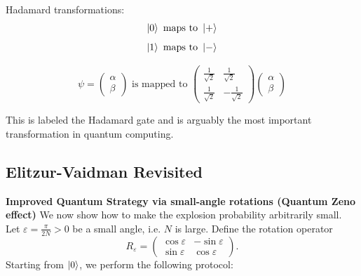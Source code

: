 \begin{center}
\end{center}

Hadamard transformations:
$$\ket{0} \text{ maps to } \ket{+}$$
$$\ket{1} \text{ maps to } \ket{-}$$

$$\psi = \begin{pmatrix} \alpha \\ \beta \end{pmatrix} \text{ is mapped to } \begin{pmatrix} \frac{1}{\sqrt{2}} & \frac{1}{\sqrt{2}} \\ \frac{1}{\sqrt{2}} & -\frac{1}{\sqrt{2}} \end{pmatrix}\begin{pmatrix} \alpha \\ \beta \end{pmatrix}$$

This is labeled the Hadamard gate and is arguably the most important transformation in quantum computing.

\subsection{Elitzur-Vaidman Revisited}

\textbf{Improved Quantum Strategy via small-angle rotations (Quantum Zeno effect)}
We now show how to make the explosion probability arbitrarily small. Let $\varepsilon = \frac{\pi}{2N}>0$ be a small angle, i.e. $N$ is large. Define the rotation operator
\[
R_\varepsilon=
\begin{pmatrix}
\cos\varepsilon & -\sin\varepsilon\\
\sin\varepsilon & \cos\varepsilon
\end{pmatrix}.
\]
Starting from $\ket{0}$, we perform the following protocol:

